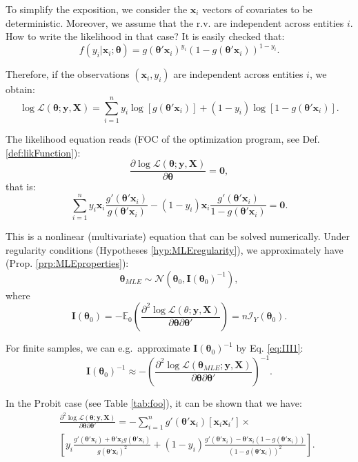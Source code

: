 \documentclass[
  12pt,
]{book}
\theoremstyle{definition}
\theoremstyle{definition}
\theoremstyle{definition}
\theoremstyle{definition}
\theoremstyle{remark}
\begin{document}
To simplify the exposition, we consider the \(\mathbf{x}_i\) vectors of covariates to be deterministic. Moreover, we assume that the r.v. are independent across entities \(i\). How to write the likelihood in that case? It is easily checked that:
\[
f(y_i|\mathbf{x}_i;\boldsymbol\theta) =   g(\boldsymbol\theta'\mathbf{x}_i)^{y_i}(1-g(\boldsymbol\theta'\mathbf{x}_i))^{1-y_i}.
\]

Therefore, if the observations \((\mathbf{x}_i,y_i)\) are independent across entities \(i\), we obtain:
\[
\log \mathcal{L}(\boldsymbol\theta;\mathbf{y},\mathbf{X}) = \sum_{i=1}^{n}y_i \log[g(\boldsymbol\theta'\mathbf{x}_i)] + (1-y_i)\log[1-g(\boldsymbol\theta'\mathbf{x}_i)].
\]

The likelihood equation reads (FOC of the optimization program, see Def. \ref{def:likFunction}):
\[
\dfrac{\partial \log \mathcal{L}(\boldsymbol\theta;\mathbf{y},\mathbf{X})}{\partial \boldsymbol\theta} = \mathbf{0},
\]
that is:
\[
\sum_{i=1}^{n} y_i \mathbf{x}_i\frac{g'(\boldsymbol\theta'\mathbf{x}_i)}{g(\boldsymbol\theta'\mathbf{x}_i)} - (1-y_i) \mathbf{x}_i \frac{g'(\boldsymbol\theta'\mathbf{x}_i)}{1-g(\boldsymbol\theta'\mathbf{x}_i)} = \mathbf{0}.
\]

This is a nonlinear (multivariate) equation that can be solved numerically. Under regularity conditions (Hypotheses \ref{hyp:MLEregularity}), we approximately have (Prop. \ref{prp:MLEproperties}):
\[
\boldsymbol\theta_{MLE} \sim \mathcal{N}(\boldsymbol\theta_0,\mathbf{I}(\boldsymbol\theta_0)^{-1}),
\]
where
\[
\mathbf{I}(\boldsymbol\theta_0) = - \mathbb{E}_0 \left( \frac{\partial^2 \log \mathcal{L}(\theta;\mathbf{y},\mathbf{X})}{\partial \boldsymbol\theta \partial \boldsymbol\theta'}\right) = n \mathcal{I}_Y(\boldsymbol\theta_0).
\]

For finite samples, we can e.g.~approximate \(\mathbf{I}(\boldsymbol\theta_0)^{-1}\) by Eq. \eqref{eq:III1}:
\[
\mathbf{I}(\boldsymbol\theta_0)^{-1} \approx -\left(\frac{\partial^2 \log \mathcal{L}(\boldsymbol\theta_{MLE};\mathbf{y},\mathbf{X})}{\partial \boldsymbol\theta \partial \boldsymbol\theta'}\right)^{-1}.
\]

In the Probit case (see Table \ref{tab:foo}), it can be shown that we have:
\begin{eqnarray*}
&&\frac{\partial^2 \log \mathcal{L}(\boldsymbol\theta;\mathbf{y},\mathbf{X})}{\partial \boldsymbol\theta \partial \boldsymbol\theta'} = - \sum_{i=1}^{n} g'(\boldsymbol\theta'\mathbf{x}_i) [\mathbf{x}_i \mathbf{x}_i'] \times \\
&&\left[y_i \frac{g'(\boldsymbol\theta'\mathbf{x}_i) + \boldsymbol\theta'\mathbf{x}_ig(\boldsymbol\theta'\mathbf{x}_i)}{g(\boldsymbol\theta'\mathbf{x}_i)^2} + (1-y_i) \frac{g'(\boldsymbol\theta'\mathbf{x}_i) - \boldsymbol\theta'\mathbf{x}_i (1 - g(\boldsymbol\theta'\mathbf{x}_i))}{(1-g(\boldsymbol\theta'\mathbf{x}_i))^2}\right].
\end{eqnarray*}
\end{document}
